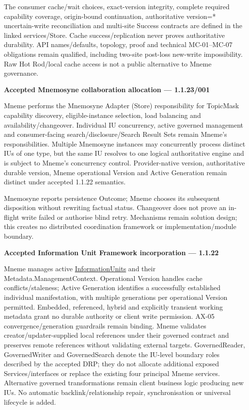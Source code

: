 The consumer cache/wait choices, exact-version integrity, complete required capability coverage, origin-bound continuation, authoritative version=* uncertain-write reconciliation and multi-site Success contracts are defined in the linked services/Store. Cache success/replication never proves authoritative durability. API names/defaults, topology, proof and technical MC-01–MC-07 obligations remain qualified, including two-site post-loss new-write impossibility. Raw Hot Rod/local cache access is not a public alternative to Mneme governance.



\par\medskip\textbf{Accepted Mnemosyne collaboration allocation — 1.1.23/001}\par


Mneme performs the Mnemosyne Adapter (Store) responsibility for TopicMask capability discovery, eligible-instance selection, load balancing and availability/changeover. Individual IU concurrency, active governed management and consumer-facing search/disclosure/Search Result Sets remain Mneme’s responsibilities. Multiple Mnemosyne instances may concurrently process distinct IUs of one type, but the same IU resolves to one logical authoritative engine and is subject to Mneme’s concurrency control. Provider-native version, authoritative durable version, Mneme operational Version and Active Generation remain distinct under accepted 1.1.22 semantics.



Mnemosyne reports persistence Outcome; Mneme chooses its subsequent disposition without rewriting factual status. Changeover does not prove an in-flight write failed or authorise blind retry. Mechanisms remain solution design; this creates no distributed coordination framework or implementation/module boundary.



\par\medskip\textbf{Accepted Information Unit Framework incorporation — 1.1.22}\par


Mneme manages active \hyperref[element:74ec609de1ae498fbf9d13e4ef8c6cbe]{InformationUnits} and their Metadata.ManagementContext. Operational Version handles cache conflicts/staleness; Active Generation identifies a successfully established individual manifestation, with multiple generations per operational Version permitted. Embedded, referenced, hybrid and explicitly transient working metadata grant no durable authority or client write permission. AX-05 convergence/generation guardrails remain binding. Mneme validates creator/updater-supplied local references under their governed contract and preserves remote references without validating external targets. GovernedReader, GovernedWriter and GovernedSearch denote the IU-level boundary roles described by the accepted DRP; they do not allocate additional exposed Services/interfaces or replace the existing four principal Mneme services. Alternative governed transformations remain client business logic producing new IUs. No automatic backlink/relationship repair, synchronisation or universal lifecycle is added.



